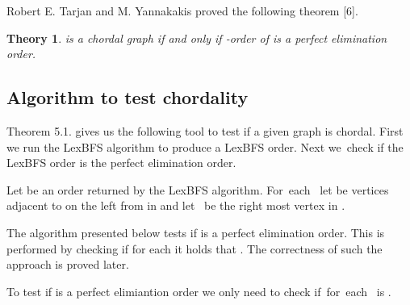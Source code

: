 \documentclass[a4paper, 11pt]{article}
\newtheorem{tw}{Theory}[section]
\begin{document}
    Robert E. Tarjan and M. Yannakakis proved the following theorem [6].

\begin{tw}
     is a chordal graph if and only if -order of  is a perfect elimination order.
\end{tw}


\subsection{Algorithm to test chordality}

Theorem 5.1. gives us the following tool to test if a given graph is chordal. First we run 
the LexBFS algorithm to produce a LexBFS order. Next we~check if the LexBFS order is 
the perfect elimination order. 

Let  be an order returned by the LexBFS algorithm. For~each~ 
let  be vertices adjacent to  on the left from  in 
and let~ be the right most vertex in . 

The algorithm presented below tests if  is a perfect elimination order. This is performed
by checking if for each  it holds that .
The correctness of such the approach is proved later.

To test if  is a perfect elimiantion order we only need to check if~for~each~
is .\\ 
\end{document}
